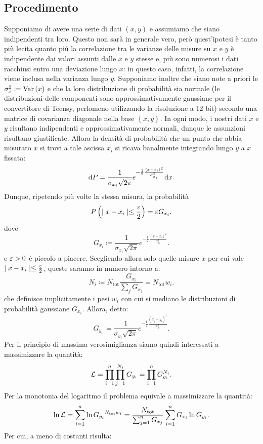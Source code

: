 \documentclass{article}[a4paper, oneside, 11pt]
\begin{document}
\subsection{Procedimento}
Supponiamo di avere una serie di dati $(x, y)$ e assumiamo che siano
indipendenti tra loro. Questo non sarà in generale vero, però quest'ipotesi
è tanto più lecita quanto più la correlazione tra le varianze delle misure su
$x$ e $y$ è indipendente dai valori assunti dalle $x$ e $y$ stesse e, più
sono numerosi i dati racchiusi entro una deviazione lungo $x$: in questo caso,
infatti, la correlazione viene inclusa nella varianza lungo $y$.
Supponiamo inoltre che siano note a priori le $\sigma_x ^2 \coloneqq \text{Var}\left(x\right)$
e che la loro distribuzione di probabilità sia normale (le distribuzioni
delle componenti sono approssimativamente gaussiane per il convertitore
di Teensy, perlomeno utilizzando la risoluzione a 12 bit) secondo una matrice
di covarianza diagonale nella base $\left\{x, y\right\}$.
In ogni modo, i nostri dati $x$ e $y$ risultano indipendenti e
approssimativamente normali, dunque le assunzioni risultano giustificate. 
Allora la densità di probabilità che un punto che abbia misurato $x$ si trovi a tale ascissa
$x_i$ si ricava banalmente integrando lungo $y$ a $x$ fissata:
\[
	\mathrm{d} P = \frac{1}{\sigma_{x_i} \sqrt{2\pi}}
	e^{-\frac{1}{2}{\frac{(x - x_i)^2}{\sigma_{x_i}^2}}} \mathrm{d} x
.\] 
Dunque, ripetendo più volte la stessa misura, la probabilità
\[
	P\left(\mid x - x_i \mid \leq \frac{\varepsilon}{2} \right) = \varepsilon G_{x_i} 
.\]
dove \[
	G_{x_i} \coloneqq \frac{1}{\sigma_{x_i} \sqrt{2\pi}}
	e^{-\frac{1}{2}{\frac{(x - x_i)^2}{\sigma_{x_i}^2}}}
.\] 
e $\varepsilon > 0$ è piccolo a piacere. Scegliendo allora solo quelle misure $x$ per
cui vale $\mid x - x_i \mid \leq \frac{\varepsilon}{2}$, queste saranno in numero
intorno a:
\[
	N_i \coloneqq N_{\text{tot}} \frac{G_{x_i}}{\sum_j G_{x_j}} =
		N_{\text{tot}} w_i
.\] 
che definisce implicitamente i pesi $w_i$ con cui si mediano le distribuzioni
di probabilità gaussiane $G_{x_i}$.
Allora, detto:
\[
	G_{y_i} \coloneqq \frac{1}{\sigma_{y_i} \sqrt{2\pi}}
	e^{-\frac{1}{2}{\frac{(\mu_y - y_i)^2}{\sigma_{y_i}^2}}}
.\] 
Per il principio di massima verosimiglianza siamo quindi interessati a
massimizzare la quantità:
\[
	\mathcal L = \prod_{i=1}^{n} \prod_{j=1}^{N_i} G_{y_i} = 
	\prod_{i=1}^{n} G_{y_i}^{N_i}
.\] 
Per la monotonia del logaritmo il problema equivale a massimizzare la quantità:
\[
	\ln{\mathcal L} = \sum_{i=1}^{n}\ln{G_{y_i}}^{N_{\text{tot}}w_i} = 
	\frac{N_{\text{tot}}} {\sum_{j=1}^{n} G_{x_j}} 
	\sum_{i=1}^{n} G_{x_i} \ln{G_{y_i}}
.\] 
Per cui, a meno di costanti risulta:
\end{document}
